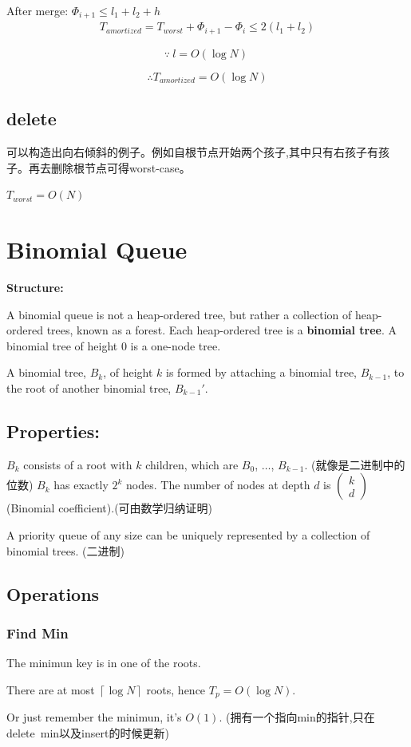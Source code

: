 \documentclass{article}
\begin{document}
After merge: $\Phi_{i+1} \le l_1+l_2 +h$
\begin{align*}
    T_{amortized}=T_{worst}+\Phi_{i+1}-\Phi_i\le 2(l_1+l_2)
\end{align*}

$$\because\ l=O(\log N)\ $$

$$\therefore T_{amortized}=O(\log N)$$

\subsection{delete}
可以构造出向右倾斜的例子。例如自根节点开始两个孩子,其中只有右孩子有孩子。再去删除根节点可得worst-case。\par
$T_{worst} = O(N)$

\newpage

\section{Binomial Queue}
\hypertarget{Binomial}{}
\textbf{Structure:}\par
A binomial queue is not a heap-ordered tree, but rather a collection of heap-ordered trees, known as a forest. Each heap-ordered tree is a \textbf{binomial tree}. 
A binomial tree of height 0 is a one-node tree.\par
A binomial tree, $B_k$, of height $k$ is formed by attaching a binomial tree, $B_{k-1}$, to the root of another binomial tree, $B_{k-1}'$. 

\subsection{Properties:}
$B_k$ consists of a root with $k$ children, which are $B_0$, $\dots$, $B_{k-1}$. (就像是二进制中的位数) $B_k$ has exactly $2^k$ nodes. The number of nodes at depth $d$ is 
$\begin{pmatrix}
    k\\d
\end{pmatrix}$ (Binomial coefficient).(可由数学归纳证明)

A priority queue of any size can be uniquely represented by a collection of binomial trees. (二进制)

\subsection{Operations}

\subsubsection{Find Min}
The minimun key is in one of the roots.\par
There are at most $\left\lceil \log N \right\rceil$ roots, hence $T_p=O(\log N)$.\par
Or just remember the minimun, it's $O(1)$. (拥有一个指向min的指针,只在delete\ min以及insert的时候更新)
\end{document}
